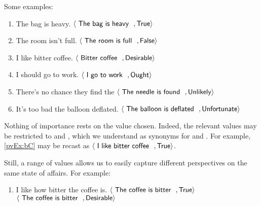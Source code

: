 \begin{note}
  Some examples:

  \begin{enumerate}[label=\arabic*., ref=(\arabic*),noitemsep, series=propValExC]
  \item
    The bag is heavy.%
    \hfill%
    \(\pv{\prop{The bag is heavy}}{\val{True}}\)
  \item
    The room isn't full.%
    \hfill%
    \(\pv{\prop{The room is full}}{\val{False}}\)
  \item
    \label{pvEx:bC}
    I like bitter coffee.%
    \hfill%
    \(\pv{\prop{Bitter coffee}}{\val{Desirable}}\)
  \item
    I should go to work.%
    \hfill%
    \(\pv{\prop{I go to work}}{\val{Ought}}\)
  \item
    There's no chance they find the%
    \hfill%
    \(\pv{\prop{The needle is found}}{\val{Unlikely}}\)
  \item
    It's too bad the balloon deflated.%
    \hfill%
    \(\pv{\prop{The balloon is deflated}}{\val{Unfortunate}}\)
  \end{enumerate}

  Nothing of importance rests on the value chosen.
  Indeed, the relevant values may be restricted to  and , which we understand as synonyms for  and .
  For example, \ref{pvEx:bC} may be recast as \(\pv{\prop{I like bitter coffee}}{\val{True}}\).

  Still, a range of values allows us to easily capture different perspectives on the same state of affairs.
  For example:
  \begin{enumerate}[label=\arabic*., ref=(\arabic*),noitemsep, resume*=propValExC]
  \item I like how bitter the coffee is.%
    \hfill%
    \(\pv{\prop{The coffee is bitter}}{\val{True}}\)\newline
    \hfill%
    \(\pv{\prop{The coffee is bitter}}{\val{Desirable}}\)
  \end{enumerate}


\end{note}
